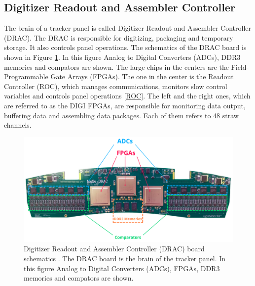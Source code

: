 \subsection{Digitizer Readout and Assembler Controller}
The brain of a tracker panel is called Digitizer Readout and Assembler Controller (DRAC). The DRAC is responsible for digitizing, packaging and temporary storage. It also controls panel operations. The schematics of the DRAC board is shown in Figure \ref{fig:drac}. In this figure Analog to Digital Converters (ADCs), DDR3 memories and compators are shown. The large chips in the centers are the Field-Programmable Gate Arrays (FPGAs). The one in the center is the Readout Controller (ROC), which manages communications, monitors slow control variables and controls panel operations \ref{ROC}. The left and the right ones, which are referred to as the DIGI FPGAs, are responsible for monitoring data output, buffering data and assembling data packages. Each of them refers to 48 straw channels. 
\begin{figure}[!h]
\centering
\includegraphics[width =\textwidth]{images/chapter3/Screenshot_20240204_115052.png}
\caption{Digitizer Readout and Assembler Controller (DRAC) board schematics \cite{drac}. The DRAC board is the brain of the tracker panel. In this figure Analog to Digital Converters (ADCs), FPGAs, DDR3 memories and compators are shown.}
\label{fig:drac}
\end{figure}
